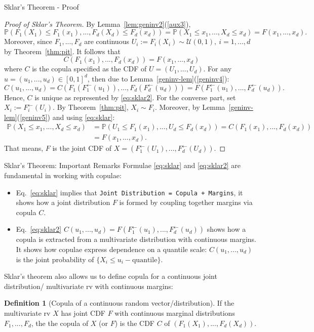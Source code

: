 \documentclass[envcountsect]{beamer}
\newcommand{\bP}{\mathbb{P}}
\theoremstyle{definition}
\newtheorem{df}{Definition}[section]
\theoremstyle{plain}
\newcommand*{\geninv}[1]{#1^{\leftarrow}}
\newcommand*{\udist}{\mathcal{U}(0,1)}
\begin{document}
\begin{frame}{Sklar's Theorem - Proof}
	\begin{proof} [Proof of Sklar's Theorem]
		By Lemma~\ref{lem:geninv2}(\ref{aux3}), 
		\begin{equation} \label{eq:sklar1}
		\bP(F_1(X_1)\le F_1(x_1),..., F_d(X_d)\le F_d(x_d))  = \bP(X_1\le x_1, ..., X_d\le x_d) = F(x_1,...,x_d).
		\end{equation}
		Moreover, since $F_1,..., F_d$ are continuous $U_i:=F_i(X_i) \sim \udist,\ i=1,...,d$ by Theorem~\ref{thm:pit}. It follows that 
		\begin{equation}
			C(F_1(x_1),..., F_d(x_d)) = F(x_1,...,x_d)
		\end{equation}
		where $C$ is the copula specified as the CDF of $U=(U_1,...,U_d)$. For any $u=(u_1,...,u_d)\in [0,1]^d$, then due to Lemma~\ref{geninv-lem}(\ref{geninv4}):
		\begin{equation} \label{eq:sklar2}
			C(u_1,...,u_d) = C(F_1(\geninv{F_1}(u_1)),...,F_d(\geninv{F_d}(u_d)))
			= F(\geninv{F_1}(u_1),...,\geninv{F_d}(u_d)).
		\end{equation}
		Hence, $C$ is unique as represented by \eqref{eq:sklar2}.
		For the converse part, set $X_i:= \geninv{F_i}(U_i)$. By Theorem~\ref{thm:pit}, $X_i \sim F_i$. Moreover, by Lemma~\ref{geninv-lem}(\ref{geninv5}) and using \eqref{eq:sklar}:
		\begin{align}
			\bP(X_1\le x_1, ..., X_d \le x_d) &= \bP(U_1 \le F_1(x_1),..., U_d\le F_d(x_d)) = C(F_1(x_1),..., F_d(x_d)) \\
			& = F(x_1,...,x_d).
		\end{align}
	That means, $F$ is the joint CDF of $X = (\geninv{F_1}(U_1),..., \geninv{F_d}(U_d))$.
	\end{proof}
\end{frame}
\begin{frame}{Sklar's Theorem: Important Remarks}
Formulae \eqref{eq:sklar} and \eqref{eq:sklar2} are fundamental in working with copulae:
\begin{itemize}
	\item Eq.~\eqref{eq:sklar} implies that {\tt Joint Distribution = Copula + Margins}, it shows how a joint distribution $F$ is formed by coupling together margins via copula $C$.
	\item Eq.~\eqref{eq:sklar2} $C(u_1,...,u_d) = F(\geninv{F_1}(u_1),...,\geninv{F_d}(u_d))$ shows how a copula is extracted from a multivariate distribution with continuous margins. It shows how copulae express dependence on a quantile scale: $C(u_1,...,u_d)$ is the joint probability of $\{X_i
	 \le u_i - \text{quantile}\}$.
\end{itemize}
Sklar's theorem also allows us to define copula for a continuous joint distribution/ multivariate rv with continuous margins:
\begin{df}[Copula of a continuous random vector/distribution]
	If the multivariate rv $X$ has joint CDF $F$ with continuous marginal distributions $F_1,..., F_d$, the the copula of $X$ (or $F$) is the CDF $C$ of $(F_1(X_1),..., F_d(X_d))$.
\end{df}
\end{frame}
\end{document}
